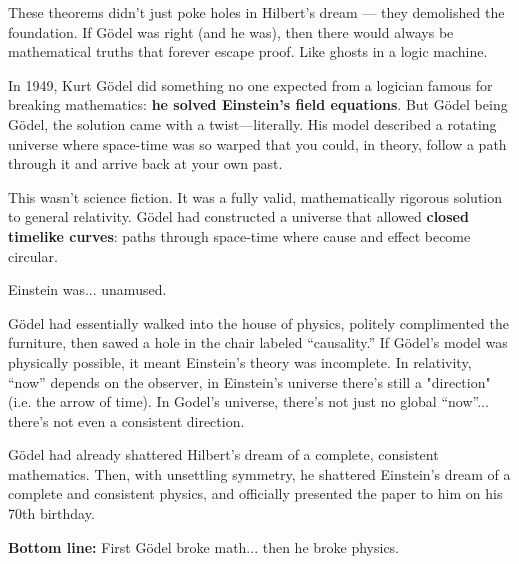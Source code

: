 These theorems didn’t just poke holes in Hilbert’s dream — they demolished the foundation. If Gödel was right (and he was), then there would always be mathematical truths that forever escape proof. Like ghosts in a logic machine.

\medskip

\begin{tcolorbox}[colback=blue!5!white, colframe=blue!50!black,
  title={Historical Sidebar: Gödel’s Time-Twisting Universe}]
  
  In 1949, Kurt Gödel did something no one expected from a logician famous for breaking mathematics:  
  \textbf{he solved Einstein’s field equations}. But Gödel being Gödel, the solution came with a twist—literally. His model described a rotating universe where space-time was so warped that you could, in theory, follow a path through it and arrive back at your own past.
  
  \medskip
  
  This wasn’t science fiction. It was a fully valid, mathematically rigorous solution to general relativity. Gödel had constructed a universe that allowed \textbf{closed timelike curves}: paths through space-time where cause and effect become circular.
  
  \medskip
  
  Einstein was... unamused.

  \medskip
  
  Gödel had essentially walked into the house of physics, politely complimented the furniture, then sawed a hole in the chair labeled ``causality.'' If Gödel’s model was physically possible, it meant Einstein's theory was incomplete.  In relativity, ``now'' depends on the observer, in Einstein's universe there's still a "direction" (i.e. the arrow of time). In Godel's universe, there’s not just no global “now”... there’s not even a consistent direction.
  
  \medskip

  Gödel had already shattered Hilbert’s dream of a complete, consistent mathematics. Then, with unsettling symmetry, he shattered Einstein's dream of a complete and consistent physics, and officially presented the paper to him on his 70th birthday.

  \medskip

  \textbf{Bottom line:} First Gödel broke math... then he broke physics.

  
\end{tcolorbox}

\vspace{1em}



